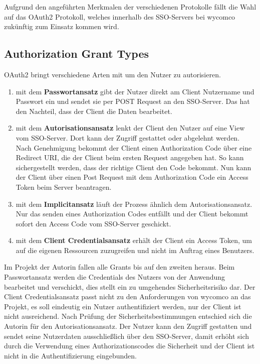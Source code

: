 Aufgrund den angeführten Merkmalen der verschiedenen Protokolle fällt die Wahl auf das OAuth2 Protokoll, welches innerhalb des \ac{SSO}-Servers bei wycomco zukünftig zum Einsatz kommen wird. 

\subsection{Authorization Grant Types}
\label{sec:AuthorizationGrants}

OAuth2 bringt verschiedene Arten mit um den Nutzer zu autorisieren.

\begin{enumerate}
\item mit dem \textbf{Passwortansatz} gibt der Nutzer direkt am Client Nutzername und Passwort ein und sendet sie per POST Request an den \ac{SSO}-Server. Das hat den Nachteil, dass der Client die Daten bearbeitet.
\item mit dem \textbf{Autorisationsansatz} lenkt der Client den Nutzer auf eine View vom \ac{SSO}-Server. Dort kann der Zugriff gestattet oder abgelehnt werden. Nach Genehmigung bekommt der Client einen Authorization Code über eine Redirect URI, die der Client beim ersten Request angegeben hat. So kann sichergestellt werden, dass der richtige Client den Code bekommt. Nun kann der Client über einen Post Request mit dem Authorization Code ein Access Token beim Server beantragen. 
\item mit dem \textbf{Implicitansatz} läuft der Prozess ähnlich dem Autorisationsansatz. Nur das senden eines Authorization Codes entfällt und der Client bekommt sofort den Access Code vom \ac{SSO}-Server geschickt.
\item mit dem \textbf{Client Credentialsansatz} erhält der Client ein Access Token, um auf die eigenen Ressourcen zuzugreifen und nicht im Auftrag eines Benutzers.
\end{enumerate}

Im Projekt der Autorin fallen alle Grants bis auf den zweiten heraus. Beim Passwortansatz werden die Credentials des Nutzers von der Anwendung bearbeitet und verschickt, dies stellt ein zu umgehendes Sicherheitsrisiko dar.
Der Client Credentialsansatz passt nicht zu den Anforderungen von wycomco an das Projekt, es soll eindeutig ein Nutzer authentifiziert werden, nur der Client ist nicht ausreichend. Nach Prüfung der Sicherheitsbestimmungen entschied sich die Autorin für den Autorisationsansatz. Der Nutzer kann den Zugriff gestatten und sendet seine Nutzerdaten ausschließlich über den \ac{SSO}-Server, damit erhöht sich durch die Verwendung eines Authorizationscodes die Sicherheit und der Client ist nicht in die Authentifizierung eingebunden.

